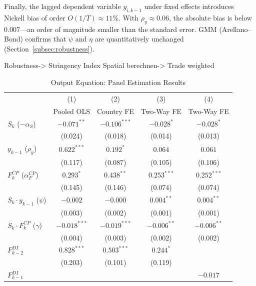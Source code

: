 \documentclass[12pt, a4paper]{article}
\begin{document}
Finally, the lagged dependent variable $y_{i,k-1}$ under fixed effects introduces
Nickell bias of order $O(1/T) \approx 11\%$. With $\rho_y \approx 0.06$, the
absolute bias is below $0.007$---an order of magnitude smaller than the standard
error. GMM (Arellano--Bond) confirms that $\psi$ and $\eta$ are quantitatively
unchanged (Section~\ref{subsec:robustness}).

Robustness-> Stringency Index Spatial berechnen-> Trade weighted



\label{sec:results}
\begin{table}[htbp]
\centering
\caption{Output Equation: Panel Estimation Results}
\label{tab:output_equation}
\small
\begin{tabular}{lcccc}
\toprule
 & (1) & (2) & (3) & (4) \\
 & Pooled OLS & Country FE & Two-Way FE & Two-Way FE \\
\midrule
$S_k$ ($-\alpha_S$)
  & $-0.071^{**}$  & $-0.106^{***}$ & $-0.028^{*}$   & $-0.028^{*}$   \\
  & (0.024)        & (0.018)        & (0.014)        & (0.013)        \\[4pt]
$y_{k-1}$ ($\rho_y$)
  & $0.622^{***}$  & $0.192^{*}$    & $0.064$        & $0.061$        \\
  & (0.117)        & (0.087)        & (0.105)        & (0.106)        \\[4pt]
$F^{CP}_k$ ($\alpha^{CP}_F$)
  & $0.293^{*}$    & $0.438^{**}$   & $0.253^{***}$  & $0.252^{***}$  \\
  & (0.145)        & (0.146)        & (0.074)        & (0.074)        \\[4pt]
$S_k \cdot y_{k-1}$ ($\psi$)
  & $-0.002$       & $-0.000$       & $0.004^{**}$   & $0.004^{**}$   \\
  & (0.003)        & (0.002)        & (0.001)        & (0.001)        \\[4pt]
$S_k \cdot F^{CP}_k$ ($\gamma$)
  & $-0.018^{***}$ & $-0.019^{***}$ & $-0.006^{**}$  & $-0.006^{**}$  \\
  & (0.004)        & (0.003)        & (0.002)        & (0.002)        \\[4pt]
$F^{DI}_{k-2}$
  & $0.828^{***}$  & $0.503^{***}$  & $0.244^{*}$    &                \\
  & (0.203)        & (0.101)        & (0.119)        &                \\[4pt]
$F^{DI}_{k-1}$
  &                &                &                & $-0.017$       \\

\end{tabular}
\end{table}
\end{document}
